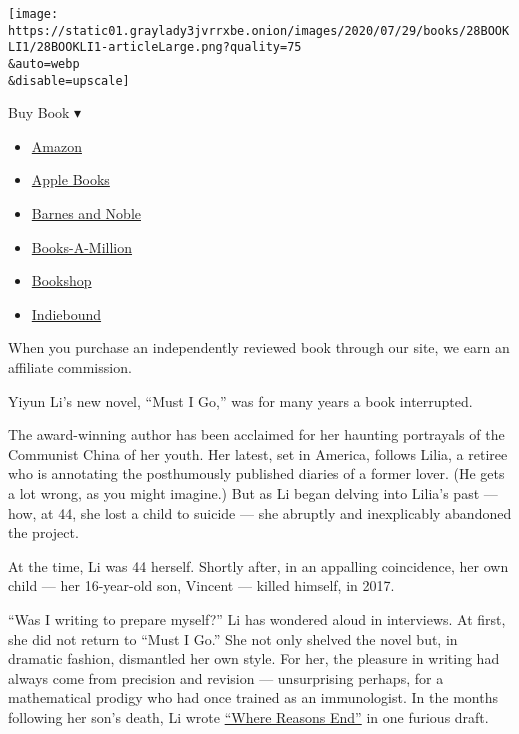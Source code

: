 \texttt{[image: https://static01.graylady3jvrrxbe.onion/images/2020/07/29/books/28BOOKLI1/28BOOKLI1-articleLarge.png?quality=75\\\&auto=webp\\\&disable=upscale]}

Buy Book ▾

\begin{itemize}
\tightlist
\item
  \href{https://www.amazon.com/gp/search?index=books\&tag=NYTBSREV-20\&field-keywords=Must+I+Go+Yiyun+Li}{Amazon}
\item
  \href{https://du-gae-books-dot-nyt-du-prd.appspot.com/buy?title=Must+I+Go\&author=Yiyun+Li}{Apple
  Books}
\item
  \href{https://www.anrdoezrs.net/click-7990613-11819508?url=https\%3A\%2F\%2Fwww.barnesandnoble.com\%2Fw\%2F\%3Fean\%3D9780399589126}{Barnes
  and Noble}
\item
  \href{https://www.anrdoezrs.net/click-7990613-35140?url=https\%3A\%2F\%2Fwww.booksamillion.com\%2Fp\%2FMust\%2BI\%2BGo\%2FYiyun\%2BLi\%2F9780399589126}{Books-A-Million}
\item
  \href{https://bookshop.org/a/3546/9780399589126}{Bookshop}
\item
  \href{https://www.indiebound.org/book/9780399589126?aff=NYT}{Indiebound}
\end{itemize}

When you purchase an independently reviewed book through our site, we
earn an affiliate commission.

Yiyun Li's new novel, ``Must I Go,'' was for many years a book
interrupted.

The award-winning author has been acclaimed for her haunting portrayals
of the Communist China of her youth. Her latest, set in America, follows
Lilia, a retiree who is annotating the posthumously published diaries of
a former lover. (He gets a lot wrong, as you might imagine.) But as Li
began delving into Lilia's past --- how, at 44, she lost a child to
suicide --- she abruptly and inexplicably abandoned the project.

At the time, Li was 44 herself. Shortly after, in an appalling
coincidence, her own child --- her 16-year-old son, Vincent --- killed
himself, in 2017.

``Was I writing to prepare myself?'' Li has wondered aloud in
interviews. At first, she did not return to ``Must I Go.'' She not only
shelved the novel but, in dramatic fashion, dismantled her own style.
For her, the pleasure in writing had always come from precision and
revision --- unsurprising perhaps, for a mathematical prodigy who had
once trained as an immunologist. In the months following her son's
death, Li wrote
\href{https://www.nytimes3xbfgragh.onion/2019/01/22/books/review-where-reasons-end-yiyun-li.html}{``Where
Reasons End''} in one furious draft.


